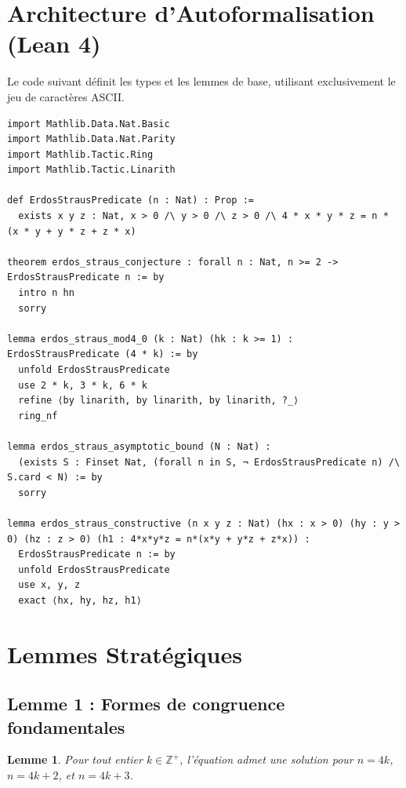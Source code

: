 \documentclass[11pt,a4paper]{article}
\newtheorem{lemma}[theorem]{Lemme}
\begin{document}
\section{Architecture d'Autoformalisation (Lean 4)}

Le code suivant définit les types et les lemmes de base, utilisant exclusivement le jeu de caractères ASCII.

\begin{verbatim}
import Mathlib.Data.Nat.Basic
import Mathlib.Data.Nat.Parity
import Mathlib.Tactic.Ring
import Mathlib.Tactic.Linarith

def ErdosStrausPredicate (n : Nat) : Prop :=
  exists x y z : Nat, x > 0 /\ y > 0 /\ z > 0 /\ 4 * x * y * z = n * (x * y + y * z + z * x)

theorem erdos_straus_conjecture : forall n : Nat, n >= 2 -> ErdosStrausPredicate n := by
  intro n hn
  sorry

lemma erdos_straus_mod4_0 (k : Nat) (hk : k >= 1) : ErdosStrausPredicate (4 * k) := by
  unfold ErdosStrausPredicate
  use 2 * k, 3 * k, 6 * k
  refine ⟨by linarith, by linarith, by linarith, ?_⟩
  ring_nf

lemma erdos_straus_asymptotic_bound (N : Nat) :
  (exists S : Finset Nat, (forall n in S, ¬ ErdosStrausPredicate n) /\ S.card < N) := by
  sorry

lemma erdos_straus_constructive (n x y z : Nat) (hx : x > 0) (hy : y > 0) (hz : z > 0) (h1 : 4*x*y*z = n*(x*y + y*z + z*x)) :
  ErdosStrausPredicate n := by
  unfold ErdosStrausPredicate
  use x, y, z
  exact ⟨hx, hy, hz, h1⟩
\end{verbatim}

\section{Lemmes Stratégiques}

\subsection{Lemme 1 : Formes de congruence fondamentales}

\begin{lemma}
Pour tout entier $k \in \mathbb{Z}^{+}$, l'équation admet une solution pour $n = 4k$, $n = 4k+2$, et $n = 4k+3$.
\end{lemma}
\end{document}
